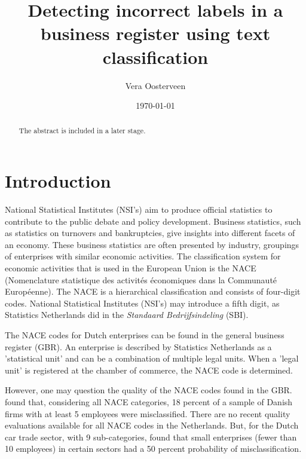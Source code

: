 \documentclass[12pt, a4paper, titlepage]{article}
\begin{document}
\title{Detecting incorrect labels in a business register using text classification}
\author{Vera Oosterveen \\   }
\date{\today}
\maketitle

							\begin{abstract}
							The abstract is included in a later stage.
							\end{abstract}


							\section{Introduction}
							\label{section:intro}

National Statistical Institutes (NSI’s) aim to produce official statistics to contribute to the public debate and policy development. Business statistics, such as statistics on turnovers and bankruptcies, give insights into different facets of an economy. These business statistics are often presented by industry, groupings of enterprises with similar economic activities. The classification system for economic activities that is used in the European Union is the NACE (Nomenclature statistique des activités économiques dans la Communauté Européenne). The NACE is a hierarchical classification and consists of four-digit codes. National Statistical Institutes (NSI’s) may introduce a fifth digit, as Statistics Netherlands did in the \textit{Standaard Bedrijfsindeling} (SBI).

The NACE codes for Dutch enterprises can be found in the general business register (GBR). An enterprise is described by Statistics Netherlands as a 'statistical unit' and can be a combination of multiple legal units. When a 'legal unit' is registered at the chamber of commerce, the NACE code is determined. 

However, one may question the quality of the NACE codes found in the GBR. \citet{Christensen2008} found that, considering all NACE categories, 18 percent of a sample of Danish firms with at least 5 employees were misclassified. There are no recent quality evaluations available for all NACE codes in the Netherlands. But, for the Dutch car trade sector, with 9 sub-categories, \citet{DeldenScholtusBurger} found that small enterprises (fewer than 10 employees) in certain sectors had a 50 percent probability of misclassification.
\end{document}
